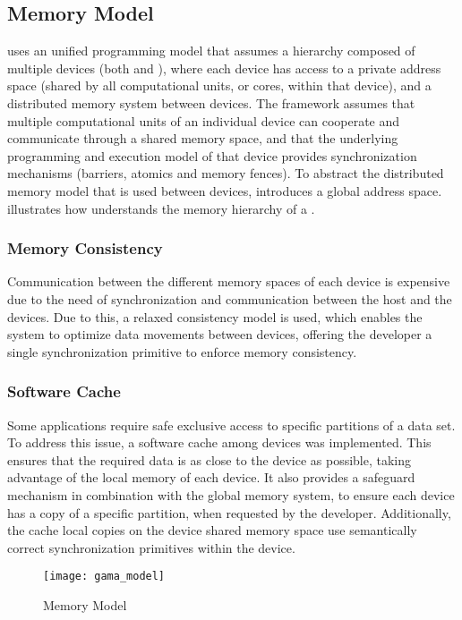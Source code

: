 \documentclass[main.tex]{subfiles}
\begin{document}
\subsection{Memory Model}

\gama uses an unified programming model that assumes a hierarchy composed of multiple devices (both \cpus and \gpus), where each device has access to a private address space (shared by all computational units, or cores, within that device), and a distributed memory system between devices. The framework assumes that multiple computational units of an individual device can cooperate and communicate through a shared memory space, and that the underlying programming and execution model of that device provides synchronization mechanisms (barriers, atomics and memory fences).
To abstract the distributed memory model that is used between devices, \gama introduces a global address space.  illustrates how \gama understands the memory hierarchy of a \hetplat.


\subsubsection{Memory Consistency}

Communication between the different memory spaces of each device is expensive due to the need of synchronization and communication between the host \cpu and the devices. Due to this, a relaxed consistency model is used, which enables the system to optimize data movements between devices, offering the developer a single synchronization primitive to enforce memory consistency.

\subsubsection{Software Cache}

Some applications require safe exclusive access to specific partitions of a data set. To address this issue, a software cache among devices was implemented. This ensures that the required data is as close to the device as possible, taking advantage of the local memory of each device. It also provides a safeguard mechanism in combination with the global memory system, to ensure each device has a copy of a specific partition, when requested by the developer. Additionally, the cache local copies on the device shared memory space use semantically correct synchronization primitives within the device.

\begin{figure}[!htp]
  \centering
  \texttt{[image: gama\_model]}
  \caption{\gama Memory Model \label{fig:gama_memory_model}}
\end{figure}
\end{document}
